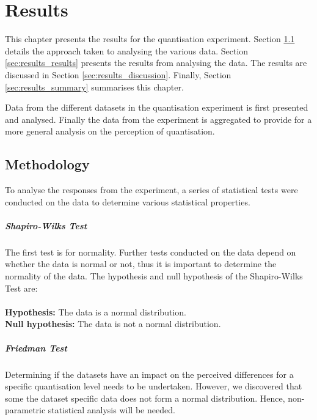 \graphicspath{{./results/}}

\chapter{Results}
\label{cha:results}

This chapter presents the results for the quantisation experiment. Section
\ref{sec:results_methodology} details the approach taken to analysing the
various data. Section \ref{sec:results_results} presents the results from
analysing the data. The results are discussed in Section
\ref{sec:results_discussion}. Finally, Section \ref{sec:results_summary}
summarises this chapter.

Data from the different datasets in the quantisation experiment is first
presented and analysed. Finally the data from the experiment is aggregated to
provide for a more general analysis on the perception of quantisation.

\section{Methodology}
\label{sec:results_methodology}

To analyse the responses from the experiment, a series of statistical tests
were conducted on the data to determine various statistical properties.

\paragraph{Shapiro-Wilks Test}
The first test is for normality. Further tests conducted on the data depend on
whether the data is normal or not, thus it is important to determine the
normality of the data. The hypothesis and null hypothesis of the Shapiro-Wilks
Test are: \\ \\
\textbf{Hypothesis:} The data is a normal distribution. \\
\textbf{Null hypothesis:} The data is not a normal distribution.

\paragraph{Friedman Test}
Determining if the datasets have an impact on the perceived differences for a
specific quantisation level needs to be undertaken. However, we discovered that
some the dataset specific data does not form a normal distribution. Hence,
non-parametric statistical analysis will be needed.

